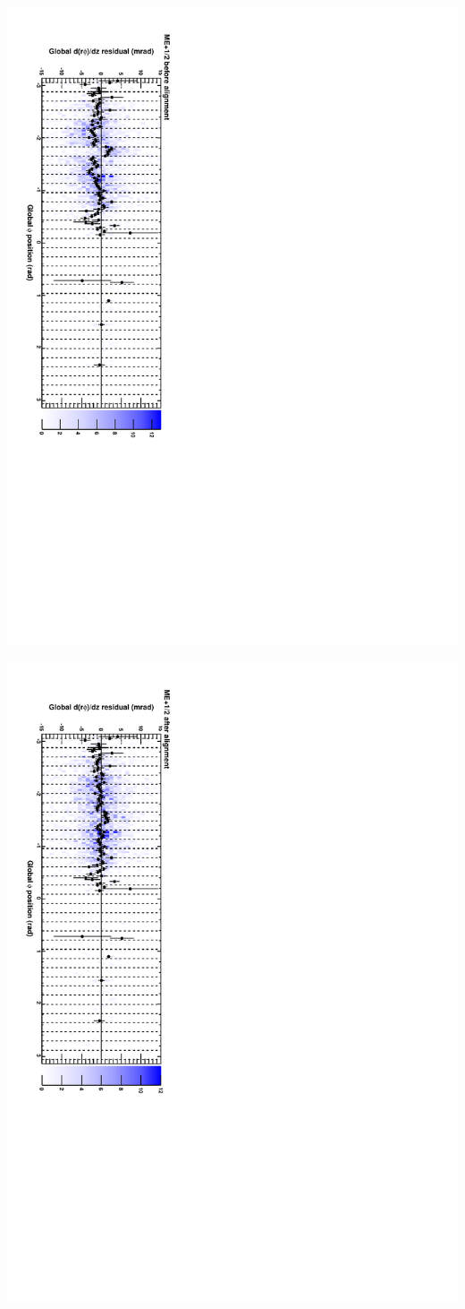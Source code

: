 \documentclass[compress]{beamer}
\begin{document}
\begin{frame}
\includegraphics[height=\linewidth, angle=90]{cscphiy_mep12_before.pdf}

\includegraphics[height=\linewidth, angle=90]{cscphiy_mep12_after.pdf}
\end{frame}
\end{document}
